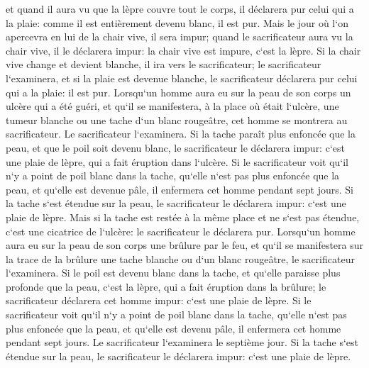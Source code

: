 \verse et quand il aura vu que la lèpre couvre tout le corps, il déclarera pur celui qui a la plaie: comme il est entièrement devenu blanc, il est pur. 
\verse Mais le jour où l`on apercevra en lui de la chair vive, il sera impur; 
\verse quand le sacrificateur aura vu la chair vive, il le déclarera impur: la chair vive est impure, c`est la lèpre. 
\verse Si la chair vive change et devient blanche, il ira vers le sacrificateur; 
\verse le sacrificateur l`examinera, et si la plaie est devenue blanche, le sacrificateur déclarera pur celui qui a la plaie: il est pur. 
\verse Lorsqu`un homme aura eu sur la peau de son corps un ulcère qui a été guéri, 
\verse et qu`il se manifestera, à la place où était l`ulcère, une tumeur blanche ou une tache d`un blanc rougeâtre, cet homme se montrera au sacrificateur. 
\verse Le sacrificateur l`examinera. Si la tache paraît plus enfoncée que la peau, et que le poil soit devenu blanc, le sacrificateur le déclarera impur: c`est une plaie de lèpre, qui a fait éruption dans l`ulcère. 
\verse Si le sacrificateur voit qu`il n`y a point de poil blanc dans la tache, qu`elle n`est pas plus enfoncée que la peau, et qu`elle est devenue pâle, il enfermera cet homme pendant sept jours. 
\verse Si la tache s`est étendue sur la peau, le sacrificateur le déclarera impur: c`est une plaie de lèpre. 
\verse Mais si la tache est restée à la même place et ne s`est pas étendue, c`est une cicatrice de l`ulcère: le sacrificateur le déclarera pur. 
\verse Lorsqu`un homme aura eu sur la peau de son corps une brûlure par le feu, et qu`il se manifestera sur la trace de la brûlure une tache blanche ou d`un blanc rougeâtre, le sacrificateur l`examinera. 
\verse Si le poil est devenu blanc dans la tache, et qu`elle paraisse plus profonde que la peau, c`est la lèpre, qui a fait éruption dans la brûlure; le sacrificateur déclarera cet homme impur: c`est une plaie de lèpre. 
\verse Si le sacrificateur voit qu`il n`y a point de poil blanc dans la tache, qu`elle n`est pas plus enfoncée que la peau, et qu`elle est devenu pâle, il enfermera cet homme pendant sept jours. 
\verse Le sacrificateur l`examinera le septième jour. Si la tache s`est étendue sur la peau, le sacrificateur le déclarera impur: c`est une plaie de lèpre. 
